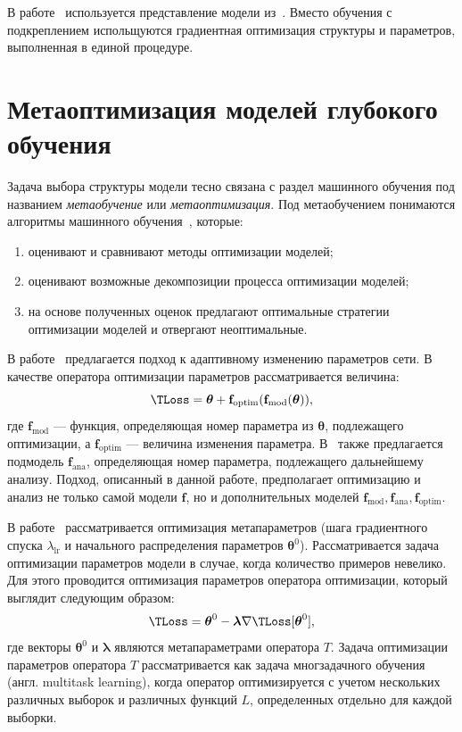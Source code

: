 В работе~\cite{darts} используется представление модели из~\cite{reinf_transfer}. Вместо обучения с подкреплением испольщуются градиентная оптимизация структуры и параметров, выполненная в единой процедуре.

\section{Метаоптимизация моделей глубокого обучения}
Задача выбора структуры модели тесно связана с раздел машинного обучения под названием \textit{метаобучение} или \textit{метаоптимизация}. Под метаобучением понимаются алгоритмы машинного обучения~\cite{metalearn}, которые:
\begin{enumerate}[1)]
\item оценивают и сравнивают методы оптимизации моделей;
\item оценивают возможные декомпозиции процесса оптимизации моделей;
\item на основе полученных оценок предлагают оптимальные стратегии оптимизации моделей и отвергают неоптимальные. 
\end{enumerate}

В работе~\cite{self_rnn} предлагается подход к адаптивному изменению параметров сети. В качестве оператора оптимизации параметров рассматривается величина:
\[
    \TLoss = \boldsymbol{\theta} + \mathbf{f}_\text{optim}(\mathbf{f}_\text{mod}( \boldsymbol{\theta})),
\]
где $\mathbf{f}_\text{mod}$ --- функция, определяющая номер параметра из $\boldsymbol{\theta}$, подлежащего оптимизации, а $ \mathbf{f}_\text{optim}$ --- величина изменения параметра. 
В~\cite{self_rnn} также предлагается подмодель $\mathbf{f}_\text{ana}$, определяющая номер параметра, подлежащего дальнейшему анализу. Подход, описанный в данной работе, предполагает оптимизацию и анализ не только самой модели $\mathbf{f}$, но и дополнительных моделей $\mathbf{f}_\text{mod}, \mathbf{f}_\text{ana}, \mathbf{f}_\text{optim}$.

В работе~\cite{meta_sgd} рассматривается оптимизация метапараметров (шага градиентного спуска $\lambda_{\text{lr}}$ и начального распределения параметров $\boldsymbol{\theta}^0$). Рассматривается задача оптимизации параметров модели в случае, когда количество примеров невелико. Для этого проводится оптимизация параметров оператора оптимизации, который выглядит следующим образом:
\[
    \TLoss =  \boldsymbol{\theta}^0 - \boldsymbol{\lambda}\nabla  \TLoss[\teta^{0}],
\]
где векторы $\boldsymbol{\theta}^0$ и $\boldsymbol{\lambda}$ являются метапараметрами оператора $T$. Задача оптимизации параметров оператора $T$ рассматривается как задача многзадачного обучения (англ. multitask learning), когда оператор оптимизируется с учетом нескольких различных выборок и различных функций $L$, определенных отдельно для каждой выборки.


